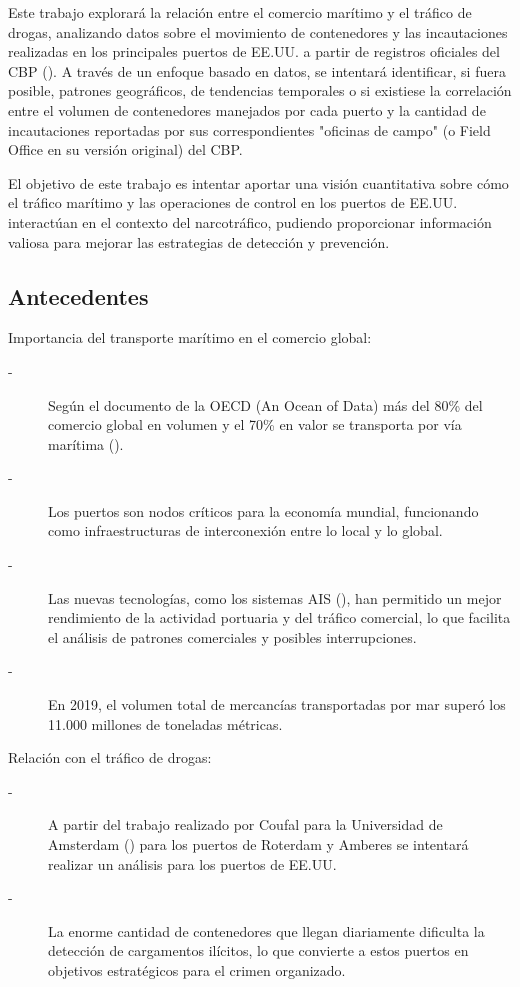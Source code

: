 \documentclass[12pt]{article}
\begin{document}
	Este trabajo explorará la relación entre el comercio marítimo y el tráfico de drogas, analizando datos sobre el movimiento de contenedores y las incautaciones realizadas en los principales puertos de EE.UU. a partir de registros oficiales del CBP (\cite{cbp_website}). A través de un enfoque basado en datos, se intentará identificar, si fuera posible, patrones geográficos, de tendencias temporales o si existiese la correlación entre el volumen de contenedores manejados por cada puerto y la cantidad de incautaciones reportadas por sus correspondientes "oficinas de campo" (o Field Office en su versión original) del CBP.
	
	El objetivo de este trabajo es intentar aportar una visión cuantitativa sobre cómo el tráfico marítimo y las operaciones de control en los puertos de EE.UU. interactúan en el contexto del narcotráfico, pudiendo proporcionar información valiosa para mejorar las estrategias de detección y prevención.
	
	

	\subsection{\label{antecedentes}Antecedentes}
	Importancia del transporte marítimo en el comercio global:
	\begin{description}
		\item[-] Según el documento de la OECD (An Ocean of Data) más del 80\% del comercio global en volumen y el 70\% en valor se transporta por vía marítima (\cite{pilgrim2024ocean}).
		\item[-] Los puertos son nodos críticos para la economía mundial, funcionando como infraestructuras de interconexión entre lo local y lo global.
		\item[-] Las nuevas tecnologías, como los sistemas AIS (\cite{nauticaprofesional2025ais}), han permitido un mejor rendimiento de la actividad portuaria y del tráfico comercial, lo que facilita el análisis de patrones comerciales y posibles interrupciones.
		\item[-] En 2019, el volumen total de mercancías transportadas por mar superó los 11.000 millones de toneladas métricas. \cite{cidob2025maritime}
	\end{description}
	
	Relación con el tráfico de drogas:
	\begin{description}
		\item[-] A partir del trabajo realizado por Coufal para la Universidad de Amsterdam (\cite{coufal2023cities}) para los puertos de Roterdam y Amberes se intentará realizar un análisis para los puertos de EE.UU.
		\item[-] La enorme cantidad de contenedores que llegan diariamente dificulta la detección de cargamentos ilícitos, lo que convierte a estos puertos en objetivos estratégicos para el crimen organizado.
	\end{description}
\end{document}
